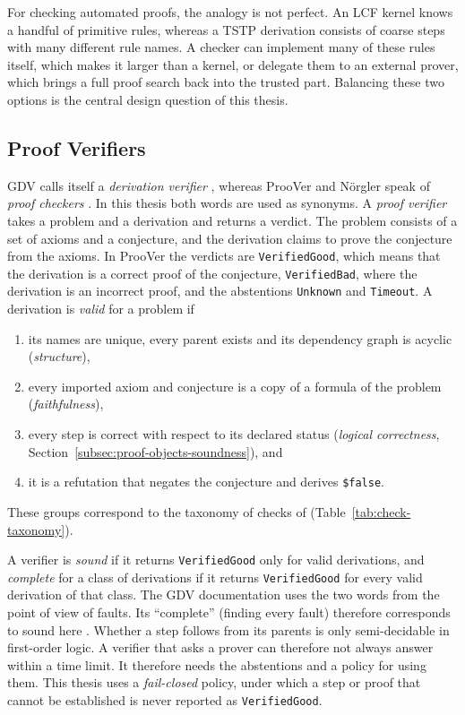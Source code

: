For checking automated proofs, the analogy is not perfect.
An LCF kernel knows a handful of primitive rules, whereas a TSTP derivation consists of coarse steps with many different rule names.
A checker can implement many of these rules itself, which makes it larger than a kernel, or delegate them to an external prover, which brings a full proof search back into the trusted part.
Balancing these two options is the central design question of this thesis.


\subsection{Proof Verifiers}
\label{subsec:verifier-def}

GDV calls itself a \emph{derivation verifier} \citep{Sutcliffe2006GDV}, whereas ProoVer and N\"orgler speak of \emph{proof checkers} \citep{taprogge2026lightweight}. In this thesis both words are used as synonyms.
A \emph{proof verifier} takes a problem and a derivation and returns a verdict.
The problem consists of a set of axioms and a conjecture, and the derivation claims to prove the conjecture from the axioms.
In ProoVer the verdicts are \texttt{VerifiedGood}, which means that the derivation is a correct proof of the conjecture, \texttt{VerifiedBad}, where the derivation is an incorrect proof, and the abstentions \texttt{Unknown} and \texttt{Timeout}.
A derivation is \emph{valid} for a problem if
\begin{enumerate}
  \item its names are unique, every parent exists and its dependency graph is acyclic (\emph{structure}),
  \item every imported axiom and conjecture is a copy of a formula of the problem (\emph{faithfulness}),
  \item every step is correct with respect to its declared status (\emph{logical correctness}, Section~\ref{subsec:proof-objects-soundness}), and
  \item it is a refutation that negates the conjecture and derives \texttt{\$false}.
\end{enumerate}
These groups correspond to the taxonomy of checks of \citet{taprogge2026lightweight} (Table~\ref{tab:check-taxonomy}).

A verifier is \emph{sound} if it returns \texttt{VerifiedGood} only for valid derivations, and \emph{complete} for a class of derivations if it returns \texttt{VerifiedGood} for every valid derivation of that class.
The GDV documentation uses the two words from the point of view of faults. Its ``complete'' (finding every fault) therefore corresponds to sound here \citep{GDVSeminar}.
Whether a step follows from its parents is only semi-decidable in first-order logic. A verifier that asks a prover can therefore not always answer within a time limit.
It therefore needs the abstentions and a policy for using them. This thesis uses a \emph{fail-closed} policy, under which a step or proof that cannot be established is never reported as \texttt{VerifiedGood}.

